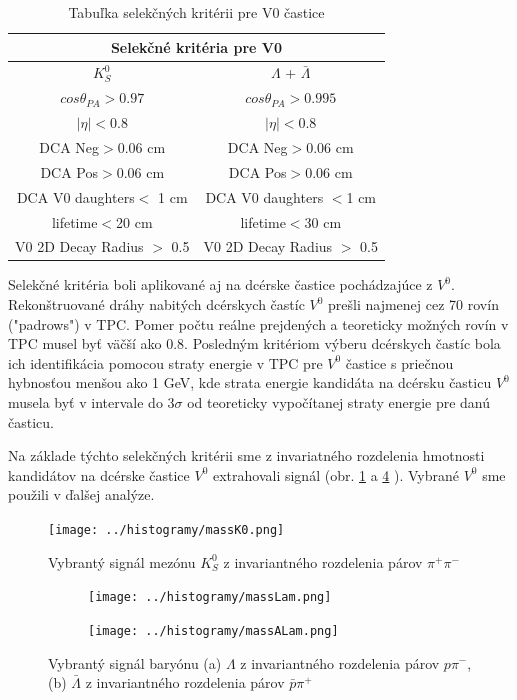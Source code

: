 \documentclass[thesismargins, thesislinespacing]{rnthesis}
\begin{document}
\begin{table}[hbtp!]
	\begin{center}
		\begin{tabular}{|c|c|}
			\hline
			 \multicolumn{2}{|c|}{Selekčné kritéria pre V0}  \\ \hline
			$K^0_S$ & $\Lambda$ + $\bar{\Lambda}$ \\ \hline
			$cos\theta_{PA} >0.97$ & $cos\theta_{PA} >0.995$  \\ \hline
			$|\eta|<0.8$ & $|\eta|<0.8$   \\ \hline
			DCA Neg$>$0.06 cm & DCA Neg$>$0.06 cm \\ \hline
			DCA Pos$>$0.06 cm & DCA Pos$>$0.06 cm \\ \hline
			DCA V0 daughters$<$ 1 cm & DCA V0 daughters $<$1 cm \\ \hline
			lifetime$<$20 cm & lifetime$<$30 cm \\ \hline
			V0 2D Decay Radius $>$ 0.5 & V0 2D Decay Radius $>$ 0.5\\ 
			\hline
		\end{tabular}
		\caption{Tabuľka selekčných kritérii pre V0 častice}
		\label{tabulka}
	\end{center}
\end{table}
\newpage
Selekčné kritéria boli aplikované aj na dcérske častice pochádzajúce z $V^0$. Rekonštruované dráhy nabitých dcérskych častíc $V^0$ prešli najmenej cez 70 rovín ("padrows") v TPC. Pomer počtu reálne prejdených a teoreticky možných rovín v TPC musel byť väčší ako 0.8. Posledným kritériom výberu dcérskych častíc bola ich identifikácia pomocou straty energie v TPC pre $V^0$ častice s priečnou hybnosťou menšou ako 1 GeV, kde strata energie kandidáta na dcérsku časticu $V^0$ musela byť v intervale do $3\sigma$ od teoreticky vypočítanej straty energie pre danú časticu.

Na základe týchto selekčných kritérii sme z invariatného rozdelenia hmotnosti kandidátov na dcérske častice $V^0$ extrahovali signál (obr. \ref{k0} a \ref{Lambdy} ). Vybrané $V^0$ sme použili v ďalšej analýze. 

\begin{figure}[hbtp!]
	\centering
	\texttt{[image: ../histogramy/massK0.png]}
	\caption{Vybrantý signál mezónu $K^0_S$ z invariantného rozdelenia párov $\pi^+\pi^-$}
	\label{k0}
\end{figure}
\begin{figure}
	\centering
	\begin{subfigure}{0.5\textwidth}
		\centering
		\texttt{[image: ../histogramy/massLam.png]}
		\caption{}
		\label{Lam}
	\end{subfigure}%
	\begin{subfigure}{0.5\textwidth}
		\centering
		\texttt{[image: ../histogramy/massALam.png]}
		\caption{}
		\label{ALam}
	\end{subfigure}
	\caption{Vybrantý signál baryónu (a) $\Lambda$ z invariantného rozdelenia párov $p\pi^-$, (b) $\bar{\Lambda}$ z invariantného rozdelenia párov $\bar{p}\pi^+$}
	\label{Lambdy}
\end{figure}
\end{document}

